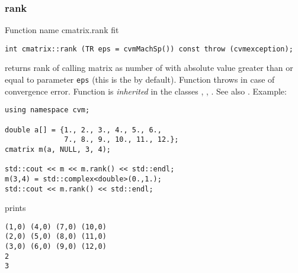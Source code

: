 \subsubsection{rank}
Function%
\pdfdest name {cmatrix.rank} fit
\begin{verbatim}
int cmatrix::rank (TR eps = cvmMachSp()) const throw (cvmexception);
\end{verbatim}
returns  rank of  calling matrix as  number of
with 
absolute value greater than or
equal to  parameter \verb"eps" (this is the
 by default).
Function throws 
in case of convergence error.
Function is \emph{inherited} in the classes
, ,
.
See also
.
Example:
\begin{Verbatim}
using namespace cvm;

double a[] = {1., 2., 3., 4., 5., 6.,
              7., 8., 9., 10., 11., 12.};
cmatrix m(a, NULL, 3, 4);

std::cout << m << m.rank() << std::endl;
m(3,4) = std::complex<double>(0.,1.);
std::cout << m.rank() << std::endl;
\end{Verbatim}
prints
\begin{Verbatim}
(1,0) (4,0) (7,0) (10,0)
(2,0) (5,0) (8,0) (11,0)
(3,0) (6,0) (9,0) (12,0)
2
3
\end{Verbatim}
\newpage



